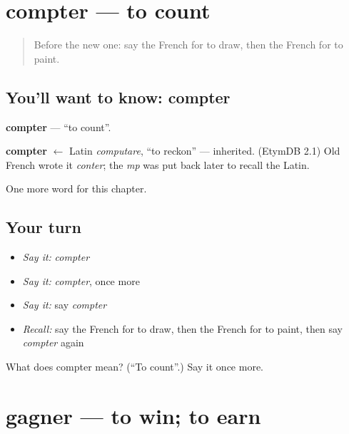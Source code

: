 \section[compter]{compter — to count}

\label{lesson:FR-C66-compter}



\begin{quote}
Before the new one: say the French for to draw, then the French for to paint.
\end{quote}

\subsection*{You'll want to know: compter}
\textbf{compter} — \textquotedblleft{}to count\textquotedblright{}.

\begin{cousinweb}
\textbf{compter} $\leftarrow$ Latin \emph{computare}, \textquotedblleft{}to reckon\textquotedblright{} — inherited. (EtymDB 2.1) Old French wrote it \emph{conter}; the \emph{mp} was put back later to recall the Latin.
\end{cousinweb}

\begin{grammarlens}[title={What you've built}]
One more word for this chapter.
\end{grammarlens}

\subsection*{Your turn}
\begin{itemize}
\raggedright
  \item \emph{Say it:} \emph{compter}
  \item \emph{Say it:} \emph{compter}, once more
  \item \emph{Say it:} say \emph{compter}
  \item \emph{Recall:} say the French for to draw, then the French for to paint, then say \emph{compter} again
\end{itemize}

\begin{tcolorbox}[breakable,colback=teal!4,colframe=teal!35!black,title={Before you move on}]
What does compter mean? (\textquotedblleft{}To count\textquotedblright{}.) Say it once more.
\end{tcolorbox}
\section[gagner]{gagner — to win; to earn}

